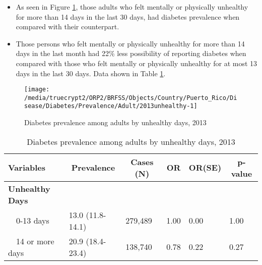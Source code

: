 \newpage
\begin{itemize}

\item As seen in Figure \ref{fig:unhlthy.Diabetes.2013}, those adults who felt mentally or physically unhealthy for more than 14 days in the last 30 days, had  
diabetes prevalence when compared with their counterpart.


\item Those persons who felt mentally or physically unhealthy for more than 14 days in the last month had 22\% less possibility of reporting diabetes when compared with those who felt mentally or physically unhealthy for at most 13 days in the last 30 days. Data shown in Table \ref{tab:unhlthy.Diabetes.2013}.

\end{itemize}

\begin{figure}[H]
\caption{Diabetes prevalence among adults by unhealthy days, 2013}
\label{fig:unhlthy.Diabetes.2013}

\begin{knitrout}
\color{fgcolor}

{\centering \texttt{[image: /media/truecrypt2/ORP2/BRFSS/Objects/Country/Puerto\_Rico/Disease/Diabetes/Prevalence/Adult/2013unhealthy-1]} 

}



\end{knitrout}
\end{figure}

\begin{table}[H]
\caption{Diabetes prevalence among adults by unhealthy days, 2013\label{tab:unhlthy.Diabetes.2013}} 
\begin{center}
\begin{tabular}{llllll}
\hline\hline
\multicolumn{1}{l}{Variables}&\multicolumn{1}{c}{Prevalence}&\multicolumn{1}{c}{Cases (N)}&\multicolumn{1}{c}{OR}&\multicolumn{1}{c}{OR(SE)}&\multicolumn{1}{c}{p-value}\tabularnewline
\hline
{\bfseries Unhealthy Days}&&&&&\tabularnewline
~~0-13 days&13.0 (11.8-14.1)&279,489&1.00&0.00&1.00\tabularnewline
~~14 or more days&20.9 (18.4-23.4)&138,740&0.78&0.22&0.27\tabularnewline
\hline
\end{tabular}\end{center}

\end{table}


